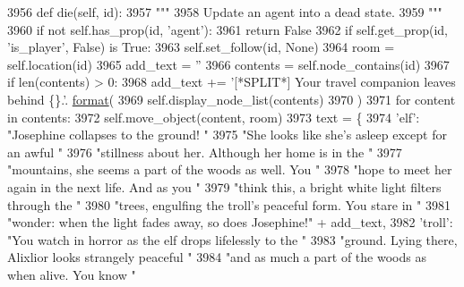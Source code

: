 \begin{DoxyCode}
3956     \textcolor{keyword}{def }die(self, id):
3957         \textcolor{stringliteral}{"""}
3958 \textcolor{stringliteral}{        Update an agent into a dead state.}
3959 \textcolor{stringliteral}{        """}
3960         \textcolor{keywordflow}{if} \textcolor{keywordflow}{not} self.has\_prop(id, \textcolor{stringliteral}{'agent'}):
3961             \textcolor{keywordflow}{return} \textcolor{keyword}{False}
3962         \textcolor{keywordflow}{if} self.get\_prop(id, \textcolor{stringliteral}{'is\_player'}, \textcolor{keyword}{False}) \textcolor{keywordflow}{is} \textcolor{keyword}{True}:
3963             self.set\_follow(id, \textcolor{keywordtype}{None})
3964             room = self.location(id)
3965             add\_text = \textcolor{stringliteral}{''}
3966             contents = self.node\_contains(id)
3967             \textcolor{keywordflow}{if} len(contents) > 0:
3968                 add\_text += \textcolor{stringliteral}{'[*SPLIT*] Your travel companion leaves behind \{\}.'}.
      \hyperlink{namespaceparlai_1_1chat__service_1_1services_1_1messenger_1_1shared__utils_a32e2e2022b824fbaf80c747160b52a76}{format}(
3969                     self.display\_node\_list(contents)
3970                 )
3971                 \textcolor{keywordflow}{for} content \textcolor{keywordflow}{in} contents:
3972                     self.move\_object(content, room)
3973             text = \{
3974                 \textcolor{stringliteral}{'elf'}: \textcolor{stringliteral}{"Josephine collapses to the ground! "}
3975                 \textcolor{stringliteral}{"She looks like she's asleep except for an awful "}
3976                 \textcolor{stringliteral}{"stillness about her. Although her home is in the "}
3977                 \textcolor{stringliteral}{"mountains, she seems a part of the woods as well. You "}
3978                 \textcolor{stringliteral}{"hope to meet her again in the next life. And as you "}
3979                 \textcolor{stringliteral}{"think this, a bright white light filters through the "}
3980                 \textcolor{stringliteral}{"trees, engulfing the troll's peaceful form. You stare in "}
3981                 \textcolor{stringliteral}{"wonder: when the light fades away, so does Josephine!"} + add\_text,
3982                 \textcolor{stringliteral}{'troll'}: \textcolor{stringliteral}{"You watch in horror as the elf drops lifelessly to the "}
3983                 \textcolor{stringliteral}{"ground. Lying there, Alixlior looks strangely peaceful "}
3984                 \textcolor{stringliteral}{"and as much a part of the woods as when alive. You know "}

\end{DoxyCode}
